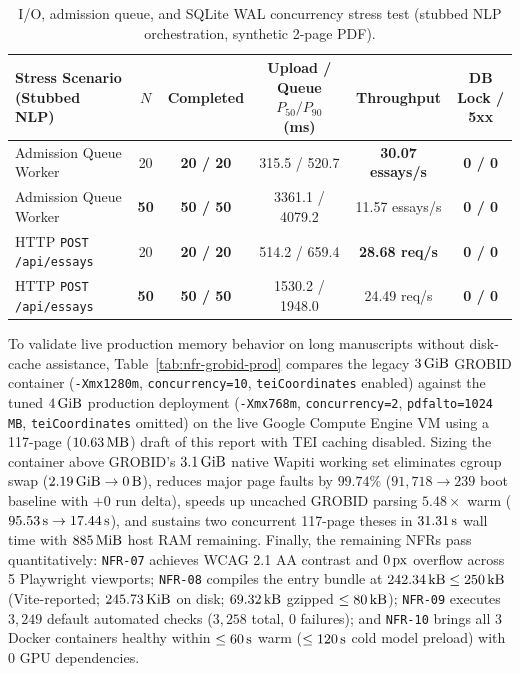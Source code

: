 {\setlength{\tabcolsep}{3pt}
\begin{table}[!htbp]
\centering
\caption{I/O, admission queue, and SQLite WAL concurrency stress test (stubbed NLP orchestration, synthetic 2-page PDF).}\label{tab:nfr-deadline-stress}
\begin{tabular}{|L{0.23}|C{0.07}|C{0.15}|C{0.21}|C{0.19}|C{0.15}|}
\hline
\textbf{Stress Scenario (Stubbed NLP)} & \textbf{$N$} & \textbf{Completed} & \textbf{Upload / Queue $P_{50}/P_{90}$ (ms)} & \textbf{Throughput} & \textbf{DB Lock / 5xx} \\
\hline
Admission Queue Worker & 20 & \textbf{20 / 20} & 315.5 / 520.7 & \textbf{30.07 essays/s} & \textbf{0 / 0} \\
\hline
Admission Queue Worker & \textbf{50} & \textbf{50 / 50} & 3361.1 / 4079.2 & 11.57 essays/s & \textbf{0 / 0} \\
\hline
HTTP \texttt{POST /api/essays} & 20 & \textbf{20 / 20} & 514.2 / 659.4 & \textbf{28.68 req/s} & \textbf{0 / 0} \\
\hline
HTTP \texttt{POST /api/essays} & \textbf{50} & \textbf{50 / 50} & 1530.2 / 1948.0 & 24.49 req/s & \textbf{0 / 0} \\
\hline
\end{tabular}
\end{table}
}

To validate live production memory behavior on long manuscripts without disk-cache assistance, Table~\ref{tab:nfr-grobid-prod} compares the legacy $3\text{\,GiB}$ GROBID container (\texttt{-Xmx1280m}, \texttt{concurrency=10}, \texttt{teiCoordinates} enabled) against the tuned $4\text{\,GiB}$ production deployment (\texttt{-Xmx768m}, \texttt{concurrency=2}, \texttt{pdfalto=1024\,MB}, \texttt{teiCoordinates} omitted) on the live Google Compute Engine VM using a 117-page ($10.63\text{\,MB}$) draft of this report with TEI caching disabled. Sizing the container above GROBID's $3.1\text{\,GiB}$ native Wapiti working set eliminates cgroup swap ($2.19\text{\,GiB} \rightarrow 0\text{\,B}$), reduces major page faults by $99.74\%$ ($91{,}718 \rightarrow 239$ boot baseline with $+0$ run delta), speeds up uncached GROBID parsing $5.48\times$ warm ($95.53\text{\,s} \rightarrow 17.44\text{\,s}$), and sustains two concurrent 117-page theses in $31.31\text{\,s}$ wall time with $885\text{\,MiB}$ host RAM remaining. Finally, the remaining NFRs pass quantitatively: \texttt{NFR-07} achieves WCAG 2.1 AA contrast and $0\text{\,px}$ overflow across 5 Playwright viewports; \texttt{NFR-08} compiles the entry bundle at $242.34\text{\,kB} \le 250\text{\,kB}$ (Vite-reported; $245.73\text{\,KiB}$ on disk; $69.32\text{\,kB}$ gzipped $\le 80\text{\,kB}$); \texttt{NFR-09} executes $3{,}249$ default automated checks ($3{,}258$ total, $0$ failures); and \texttt{NFR-10} brings all 3 Docker containers healthy within $\le 60\text{\,s}$ warm ($\le 120\text{\,s}$ cold model preload) with $0$ GPU dependencies.

